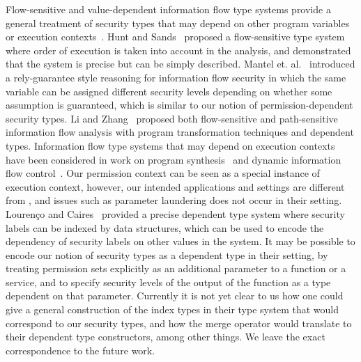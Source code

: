 {{{Flow-sensitive and value-dependent information flow type systems
provide a general treatment of security types that may depend on other
program variables or execution
contexts~\cite{Toby2016csf,Polikarpova16,Dependent_SIFUM_Type_Systems-AFP,Dependent_SIFUM_Refinement-AFP,Murray:2015jm,Li:2016jb,Zhang:2015bc,Li:2015vw,Lourenco:2015:DIF,Lourenco13,Swamy13,Yang12POPL,MantelSS11,Nanevski11,SwamyCC10,Zheng:2007cd,Tse07,Li:csf17,Hunt:2006:FST:1111037.1111045}.
Hunt and Sands~\cite{Hunt:2006:FST:1111037.1111045} proposed a
flow-sensitive type system where order of execution is taken into
account in the analysis, and demonstrated that the system is precise
but can be simply described.
Mantel et. al.~\cite{MantelSS11} introduced a rely-guarantee style
reasoning for information flow security in which the same variable can
be assigned different security levels depending on whether some
assumption is guaranteed, which is similar to our notion of
permission-dependent security types.
Li and Zhang~\cite{Li:csf17} proposed 
both flow-sensitive and path-sensitive information flow analysis with
program transformation techniques and dependent types.
Information flow type systems that may depend on execution contexts
have been considered in work on program synthesis~\cite{Polikarpova16} and
dynamic information flow control~\cite{Yang12POPL}. Our permission context can be seen as a
special instance of execution context, however, our intended
applications and settings are different from \cite{Yang12POPL,Polikarpova16},
and issues such as parameter laundering does not occur in their
setting. 
Louren\c{c}o and Caires~\cite{Lourenco:2015:DIF} provided a precise dependent type
system where security labels can be indexed by data structures, which
can be used to encode the dependency of security labels on other
values in the system.
It may be possible to encode our notion of security types as a
dependent type in their setting, by treating permission sets
explicitly as an additional parameter to a function or a service, and
to specify security levels of the output of the function as a type
dependent on that parameter.  Currently it is not yet clear to us how
one could give a general construction of the index types in their type
system that would correspond to our security types, and how the merge
operator would translate to their dependent type constructors, among
other things.
We leave the exact correspondence to the future work.


}}}
